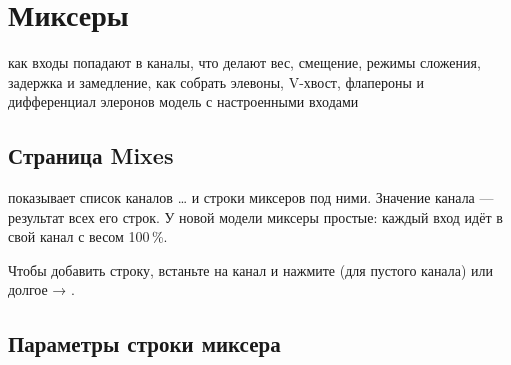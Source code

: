 \chapter{Миксеры}
\label{ch:mixes}
\chapterintro
  {как входы попадают в каналы, что делают вес, смещение, режимы сложения, задержка и
   замедление, как собрать элевоны, V-хвост, флапероны и дифференциал элеронов}
  {модель с настроенными входами}

\section{Страница Mixes}

 показывает список каналов … и строки миксеров под ними.
Значение канала --- результат всех его строк. У новой модели миксеры простые: каждый вход
идёт в свой канал с весом 100\,\%.

\begin{center}
\end{center}

Чтобы добавить строку, встаньте на канал и нажмите  (для пустого канала) или
долгое  → .

\section{Параметры строки миксера}

